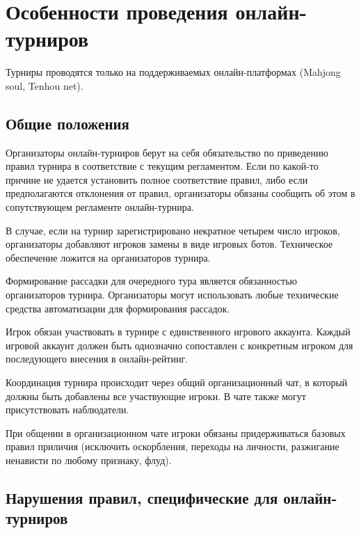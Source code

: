 \section{Особенности проведения онлайн-турниров}
	
Турниры проводятся только на поддерживаемых онлайн-платформах (Mahjong soul, Tenhou net). 

\subsection{Общие положения}

Организаторы онлайн-турниров берут на себя обязательство по приведению правил турнира в соответствие с текущим регламентом. Если по какой-то причине не удается установить полное соответствие правил, либо если предполагаются отклонения от правил, организаторы обязаны сообщить об этом в сопутствующем регламенте онлайн-турнира.

В случае, если на турнир зарегистрировано некратное четырем число игроков, организаторы добавляют игроков замены в виде игровых ботов. Техническое обеспечение ложится на организаторов турнира.

Формирование рассадки для очередного тура является обязанностью организаторов турнира. Организаторы могут использовать любые технические средства автоматизации для формирования рассадок.

Игрок обязан участвовать в турнире с единственного игрового аккаунта. Каждый игровой аккаунт должен быть однозначно сопоставлен с конкретным игроком для последующего внесения в онлайн-рейтинг.

Координация турнира происходит через общий организационный чат, в который должны быть добавлены все участвующие игроки. В чате также могут присутствовать наблюдатели.

При общении в организационном чате игроки обязаны придерживаться базовых правил приличия (исключить оскорбления, переходы на личности, разжигание ненависти по любому признаку, флуд).

\subsection{Нарушения правил, специфические для онлайн-турниров}

